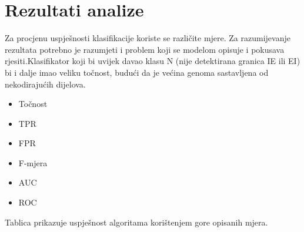 \section{Rezultati analize}
\label{ch:ch5}


Za procjenu uspješnosti klasifikacije koriste se različite mjere. Za razumijevanje rezultata potrebno je razumjeti i problem koji se modelom opisuje i pokusava rjesiti.Klasifikator koji bi uvijek davao klasu N (nije detektirana granica IE ili EI) bi i dalje imao veliku točnost, budući da je većina genoma sastavljena od nekodirajućih dijelova.

\begin{itemize}
   \item Točnost 
   \item TPR
   \item FPR
   \item F-mjera
   \item AUC
   \item ROC
\end{itemize}


Tablica prikazuje uspješnost algoritama korištenjem gore opisanih mjera.
